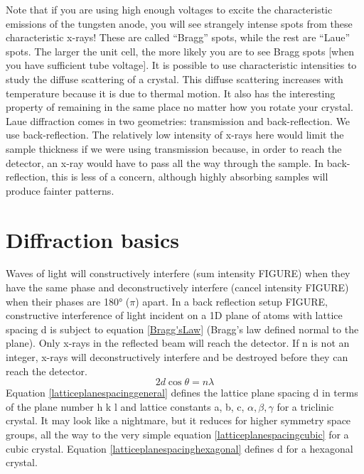 Note that if you are using high enough voltages to excite the characteristic emissions of the tungsten anode, you will see strangely intense spots from these characteristic x-rays! These are called “Bragg” spots, while the rest are “Laue” spots. The larger the unit cell, the more likely you are to see Bragg spots [when you have sufficient tube voltage].
It is possible to use characteristic intensities to study the diffuse scattering of a crystal. This diffuse scattering increases with temperature because it is due to thermal motion. It also has the interesting property of remaining in the same place no matter how you rotate your crystal.
Laue diffraction comes in two geometries: transmission and back-reflection. We use back-reflection. The relatively low intensity of x-rays here would limit the sample thickness if we were using transmission because, in order to reach the detector, an x-ray would have to pass all the way through the sample. In back-reflection, this is less of a concern, although highly absorbing samples will produce fainter patterns.
\section{Diffraction basics}
Waves of light will constructively interfere (sum intensity FIGURE) when they have the same phase and deconstructively interfere (cancel intensity FIGURE) when their phases are \ang{180} ($\pi$) apart. In a back reflection setup FIGURE, constructive interference of light incident on a 1D plane of atoms with lattice spacing d is subject to equation \ref{Bragg'sLaw} (Bragg’s law defined normal to the plane). Only x-rays in the reflected beam will reach the detector. If n is not an integer, x-rays will deconstructively interfere and be destroyed before they can reach the detector.
\begin{equation}
    2d\cos{\theta} = n\lambda
    \label{Bragg'sLaw}
\end{equation}
Equation \ref{latticeplanespacinggeneral} defines the lattice plane spacing d in terms of the plane number h k l and lattice constants a, b, c, $\alpha, \beta, \gamma$ for a triclinic crystal. It may look like a nightmare, but it reduces for higher symmetry space groups, all the way to the very simple equation \ref{latticeplanespacingcubic} for a cubic crystal. Equation \ref{latticeplanespacinghexagonal} defines d for a hexagonal crystal.

